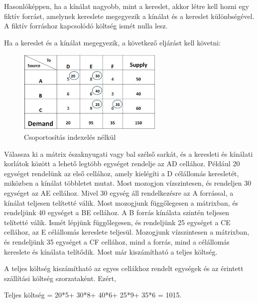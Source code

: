 Hasonlóképpen, ha a kínálat nagyobb, mint a kereslet, akkor létre kell hozni egy fiktív forrást, amelynek kereslete megegyezik a kínálat és a kereslet különbségével. A fiktív forráshoz kapcsolódó költség ismét nulla lesz.

Ha a kereslet és a kínálat megegyezik, a következő eljárást kell követni:

\begin{figure}[h!]
	\centering
	\includegraphics[width=7cm]{images/2.jpg}
	\caption{Csoportosítás indexelés nélkül}
	\label{fig:explain_2_1}
\end{figure}

Válassza ki a mátrix északnyugati vagy bal szélső sarkát, és a keresleti és kínálati korlátok között a lehető legtöbb egységet rendelje az AD cellához. Például 20 egységet rendelünk az első cellához, amely kielégíti a D célállomás keresletét, miközben a kínálat többletet mutat.
Most mozogjon vízszintesen, és rendeljen 30 egységet az AE cellához. Mivel 30 egység áll rendelkezésre az A forrással, a kínálat teljesen telítetté válik.
Most mozogjunk függőlegesen a mátrixban, és rendeljünk 40 egységet a BE cellához. A B forrás kínálata szintén teljesen telítetté válik.
Ismét lépjünk függőlegesen, és rendeljünk 25 egységet a CE cellához, az E célállomás kereslete teljesül.
Mozogjunk vízszintesen a mátrixban, és rendeljünk 35 egységet a CF cellához, mind a forrás, mind a célállomás kereslete és kínálata telítődik. Most már kiszámítható a teljes költség.

A teljes költség kiszámítható az egyes cellákhoz rendelt egységek és az érintett szállítási költség szorzataként. Ezért,

Teljes költség = 20*5+ 30*8+ 40*6+ 25*9+ 35*6 = 1015.


















